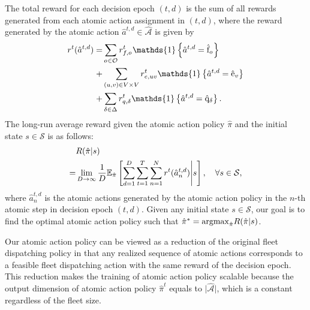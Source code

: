 The total reward for each decision epoch $(t, d)$ is the sum of all rewards generated from each atomic action assignment in $(t, d)$, where the reward generated by the atomic action $\hat{a}^{t,d} \in \hat{\mathcal{A}}$ is given by
\begin{align*}
    r^t(\hat{a}^{t,d}) =& \sum_{\triptype{} \in \Triptype} r^t_{f, \triptype{}}\mathds{1}\left\{\hat{a}^{t,d} = \afulfillred{\triptype{}}\right\}\\
    +& \sum_{(\origin,\destination) \in \Region \times \Region} r^t_{e, \origin\destination}\mathds{1}\left\{\hat{a}^{t,d} = \areroutered{\destination}\right\}\\ 
    +& \sum_{\delta \in \Delta} r^t_{q, \delta}\mathds{1}\left\{\hat{a}^{t,d} = \achargered{\delta}\right\}.
\end{align*}
The long-run average reward given the atomic action policy $\hat{\pi}$ and the initial state $s \in \mathcal{S}$ is as follows: 
\begin{align*}
    &R(\hat{\pi} \vert s) \\
    =& \lim_{D \rightarrow \infty} \frac{1}{D} \mathbb{E}_{\hat{\pi}}\left[ \sum_{d = 1}^{D}\sum_{t=1}^T \sum_{n=1}^{N} r^{t}(\hat{a}^{t, d}_{n}) \Bigg\vert s \right],\quad \forall s \in \mathcal{S},
\end{align*}
where $\hat{a}_n^{t, d}$ is the atomic actions generated by the atomic action policy in the $n$-th atomic step in decision epoch $(t, d)$. Given any initial state $s \in \mathcal{S}$, our goal is to find the optimal atomic action policy such that $\hat{\pi}^{*} = \mathrm{argmax}_{\hat{\pi}} R(\hat{\pi} \vert s)$. 

Our atomic action policy can be viewed as a reduction of the original fleet dispatching policy in that any realized sequence of atomic actions corresponds to a feasible fleet dispatching action with the same reward of the decision epoch. This reduction makes the training of atomic action policy scalable because the output dimension of atomic action policy $\hat{\pi}^t$ equals to $\vert \hat{\mathcal{A}}\vert$, which is a constant regardless of the fleet size. 

